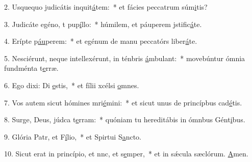 2. Usquequo judicátis inquit\uline{á}tem:~* et fácies peccatrum súm\uline{i}tis?\par 
3. Judicáte egéno, t pup\uline{í}llo:~* húmilem, et páuperem jstific\uline{á}te.\par 
4. Erípte p\uline{áu}perem:~* et egénum de manu peccatórs liber\uline{á}te.\par 
5. Nesciérunt, neque intellexérunt, in ténbris \uline{á}mbulant:~* movebúntur ómnia fundménta t\uline{e}rræ.\par 
6. Ego dixi: Di \uline{e}stis,~* et fílii xcélsi \uline{o}mnes.\par 
7. Vos autem sicut hómines mri\uline{é}mini:~* et sicut unus de princípbus cad\uline{é}tis.\par 
8. Surge, Deus, júdca t\uline{e}rram:~* quóniam tu hereditábis in ómnbus Gént\uline{i}bus.\par 
9. Glória Patr, et F\uline{í}lio,~* et Spirtui S\uline{a}ncto.\par 
10. Sicut erat in princípio, et nnc, et s\uline{e}mper,~* et in sǽcula sæclórum. \uline{A}men.\par 
